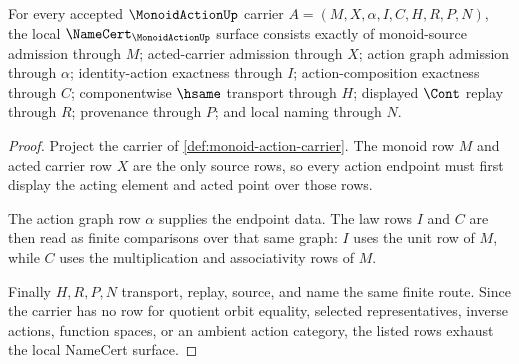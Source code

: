 \begin{theorem}
\label{thm:monoid-action-namecert-obligations}
For every accepted $\MonoidActionUp$ carrier $A=(M,X,\alpha,I,C,H,R,P,N)$, the local $\NameCert_{\MonoidActionUp}$ surface consists exactly of monoid-source admission through $M$; acted-carrier admission through $X$; action graph admission through $\alpha$; identity-action exactness through $I$; action-composition exactness through $C$; componentwise $\hsame$ transport through $H$; displayed $\Cont$ replay through $R$; provenance through $P$; and local naming through $N$.
\end{theorem}
\begin{proof}
Project the carrier of \autoref{def:monoid-action-carrier}. The monoid row $M$ and acted carrier row $X$ are the only source rows, so every action endpoint must first display the acting element and acted point over those rows.

The action graph row $\alpha$ supplies the endpoint data. The law rows $I$ and $C$ are then read as finite comparisons over that same graph: $I$ uses the unit row of $M$, while $C$ uses the multiplication and associativity rows of $M$.

Finally $H,R,P,N$ transport, replay, source, and name the same finite route. Since the carrier has no row for quotient orbit equality, selected representatives, inverse actions, function spaces, or an ambient action category, the listed rows exhaust the local NameCert surface.
\end{proof}

